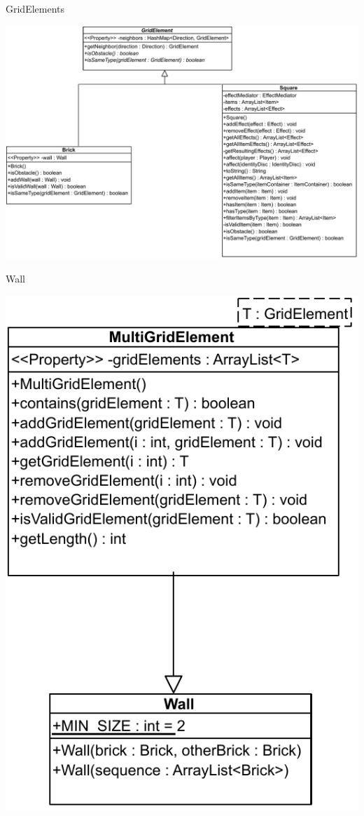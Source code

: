 \documentclass[11pt,t]{beamer}
\begin{document}
\begin{frame}{GridElements}
\begin{center}
\includegraphics[scale=0.35]{images/gridelements}
\end{center}
\end{frame}

\begin{frame}{Wall}
\begin{center}
\includegraphics[scale=0.4]{images/wall}
\end{center}
\end{frame}
\end{document}
